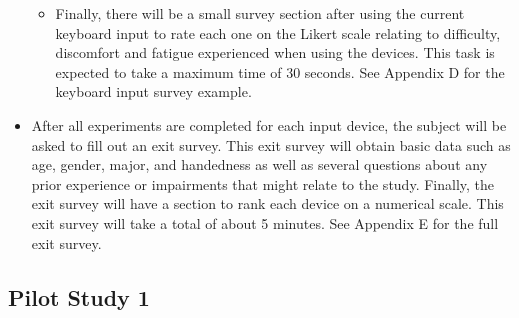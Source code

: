 \begin{itemize}
\begin{itemize}
\item Finally, there will be a small survey section after using the current keyboard input to rate each one on the Likert scale relating to difficulty, discomfort and fatigue experienced when using the devices. This task is expected to take a maximum time of 30 seconds. See Appendix D for the keyboard input survey example.
\end{itemize}
\item After all experiments are completed for each input device, the subject will be asked to fill out an exit survey. This exit survey will obtain basic data such as age, gender, major, and handedness as well as several questions about any prior experience or impairments that might relate to the study. Finally, the exit survey will have a section to rank each device on a numerical scale. This exit survey will take a total of about 5 minutes. See Appendix E for the full exit survey.
\end{itemize}

\begin{table}[h]
\centering
\caption[Schedule of Assessments]{\centering Schedule of Assessments for a single study visit (in minutes).}
\label{table_schedule_of_assessments}
\end{table}

\subsection{Pilot Study 1}

